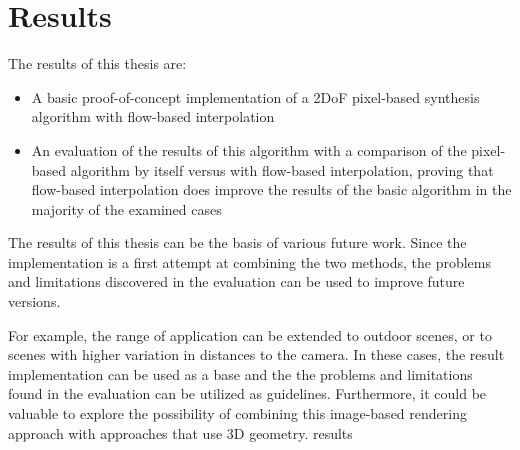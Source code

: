 \section*{Results}
The results of this thesis are:
\begin{itemize}
  \item A basic proof-of-concept implementation of a 2DoF pixel-based synthesis algorithm with flow-based interpolation
  \item An evaluation of the results of this algorithm with a comparison of the pixel-based algorithm by itself versus with flow-based interpolation, proving that flow-based interpolation does improve the results of the basic algorithm in the majority of the examined cases
\end{itemize}

The results of this thesis can be the basis of various future work. Since the implementation is a first attempt at combining the two methods, the problems and limitations discovered in the evaluation can be used to improve future versions. 

For example, the range of application can be extended to outdoor scenes, or to scenes with higher variation in distances to the camera. In these cases, the result implementation can be used as a base and the the problems and limitations found in the evaluation can be utilized as guidelines. Furthermore, it could be valuable to explore the possibility of combining this image-based rendering approach with approaches that use 3D geometry.
results



